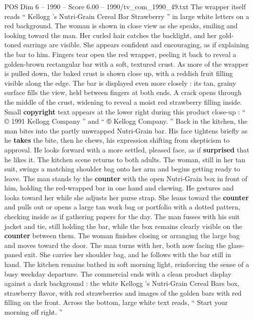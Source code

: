 \begin{textsample}{POS Dim 6 – 1990 – Score 6.00 – 1990/tv\_com\_1990\_49.txt}
The wrapper itself reads “ Kellogg ’s Nutri-Grain Cereal Bar Strawberry ” in large white letters on a red background.
The woman is shown in close view as she speaks, smiling and looking toward the man.
Her curled hair catches the backlight, and her gold-toned earrings are visible.
She appears confident and encouraging, as if explaining the bar to him.
Fingers tear open the red wrapper, peeling it back to reveal a golden-brown rectangular bar with a soft, textured crust.
As more of the wrapper is pulled down, the baked crust is shown close up, with a reddish fruit filling visible along the edge.
The bar is displayed even more closely : its tan, grainy surface fills the view, held between fingers at both ends.
A crack opens through the middle of the crust, widening to reveal a moist red strawberry filling inside.
Small \textbf{copyright} text appears at the lower right during this product close-up : “ {\EmojiFont ©} 1991 Kellogg Company ” and “ {\EmojiFont ®} Kellogg Company. ” Back in the kitchen, the man bites into the partly unwrapped Nutri-Grain bar.
His face tightens briefly as he \textbf{takes} the bite, then he chews, his expression shifting from skepticism to approval.
He looks forward with a more settled, pleased face, as if \textbf{surprised} that he likes it.
The kitchen scene returns to both adults.
The woman, still in her tan suit, swings a matching shoulder bag onto her arm and begins getting ready to leave.
The man stands by the \textbf{counter} with the open Nutri-Grain box in front of him, holding the red-wrapped bar in one hand and chewing.
He gestures and looks toward her while she adjusts her purse strap.
She leans toward the \textbf{counter} and pulls out or opens a large tan work bag or portfolio with a dotted pattern, checking inside as if gathering papers for the day.
The man fusses with his suit jacket and tie, still holding the bar, while the box remains clearly visible on the \textbf{counter} between them.
The woman finishes closing or arranging the large bag and moves toward the door.
The man turns with her, both now facing the glass-paned exit.
She carries her shoulder bag, and he follows with the bar still in hand.
The kitchen remains bathed in soft morning light, reinforcing the sense of a busy weekday departure.
The commercial ends with a clean product display against a dark background : the white Kellogg ’s Nutri-Grain Cereal Bars box, strawberry flavor, with red strawberries and images of the golden bars with red filling on the front.
Across the bottom, large white text reads, “ Start your morning off right. ”

\end{textsample}

